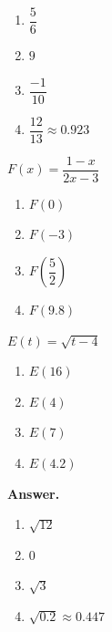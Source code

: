 \documentclass[10pt,]{book}
\theoremstyle{plain}
\theoremstyle{definition}
\theoremstyle{definition}
\theoremstyle{definition}
\begin{document}
\begin{exerciselist}
\begin{exercisegroup}
\leavevmode%
\begin{multicols}{2}
\begin{enumerate}[label=\alph*]
\item\hypertarget{li-175}{}\(\dfrac{5}{6} \)%
\item\hypertarget{li-176}{}\(9\)%
\item\hypertarget{li-177}{}\(\dfrac{-1}{10}\)%
\item\hypertarget{li-178}{}\(\dfrac{12}{13}\approx 0.923 \)%
\end{enumerate}
\end{multicols}
%
\exercise[46.]\hypertarget{exercise-56}{}\(F(x) = \dfrac{1-x}{2x-3}\) \leavevmode%
\begin{multicols}{2}
\begin{enumerate}[label=\alph*]
\item\hypertarget{li-179}{}\(F(0)\)%
\item\hypertarget{li-180}{}\(F(-3)\)%
\item\hypertarget{li-181}{}\(F\left(\dfrac{5}{2}\right)\)%
\item\hypertarget{li-182}{}\(F(9.8)\)%
\end{enumerate}
\end{multicols}
%
\exercise[47.]\hypertarget{exercise-57}{}\(E(t) =\sqrt{t-4}\) \leavevmode%
\begin{multicols}{2}
\begin{enumerate}[label=\alph*]
\item\hypertarget{li-183}{}\(E(16)\)%
\item\hypertarget{li-184}{}\(E(4)\)%
\item\hypertarget{li-185}{}\(E(7)\)%
\item\hypertarget{li-186}{}\(E(4.2)\)%
\end{enumerate}
\end{multicols}
%
\par\smallskip
\noindent\textbf{Answer.}\hypertarget{answer-34}{}\quad
\leavevmode%
\begin{multicols}{2}
\begin{enumerate}[label=\alph*]
\item\hypertarget{li-187}{}\(\sqrt{12} \)%
\item\hypertarget{li-188}{}\(0\)%
\item\hypertarget{li-189}{}\(\sqrt{3}\)%
\item\hypertarget{li-190}{}\(\sqrt{0.2}\approx 0.447 \)%
\end{enumerate}
\end{multicols}

\end{exercisegroup}
\end{exerciselist}
\end{document}

